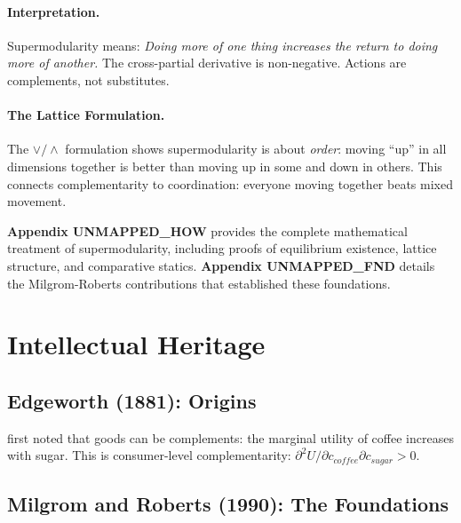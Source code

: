 \paragraph{Interpretation.}
Supermodularity means: \emph{Doing more of one thing increases the return to doing more of another.}
The cross-partial derivative is non-negative.
Actions are complements, not substitutes.

\paragraph{The Lattice Formulation.}
The $\vee / \wedge$ formulation shows supermodularity is about \emph{order}:
moving ``up'' in all dimensions together is better than moving up in some and down in others.
This connects complementarity to coordination: everyone moving together beats mixed movement.

\begin{cross-reference}
\textbf{Appendix UNMAPPED_HOW} provides the complete mathematical treatment of supermodularity,
including proofs of equilibrium existence, lattice structure, and comparative statics.
\textbf{Appendix UNMAPPED_FND} details the Milgrom-Roberts contributions that established these foundations.
\end{cross-reference}



\section{Intellectual Heritage}
\label{sec:comp-heritage}


\subsection{Edgeworth (1881): Origins}

\citet{edgeworth1881} first noted that goods can be complements:
the marginal utility of coffee increases with sugar.
This is consumer-level complementarity: $\partial^2 U / \partial c_{coffee} \partial c_{sugar} > 0$.

\subsection{Milgrom and Roberts (1990): The Foundations}

